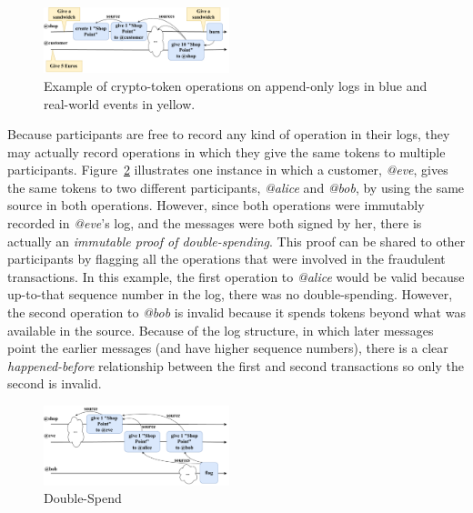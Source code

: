 \documentclass[sigplan,screen,10pt,review,anonymous]{acmart}
\begin{document}
\begin{figure}[htbp]
\centering
\includegraphics[width=0.48\textwidth]{./figures/example-drawio}
\caption{Example of crypto-token operations on append-only logs in blue and real-world events in yellow.}
\label{figure:example}
\end{figure}

Because participants are free to record any kind of operation in their logs, they may actually record operations in which they give the same tokens to multiple participants. Figure~\ref{figure:double-spend} illustrates one instance in which a customer, \textit{@eve}, gives the same tokens to two different participants, \textit{@alice} and \textit{@bob}, by using the same source in both operations. However, since both operations were immutably recorded in \textit{@eve}'s log, and the messages were both signed by her, there is actually an \textit{immutable proof of double-spending}. This proof can be shared to other participants by flagging all the operations that were involved in the fraudulent transactions. In this example, the first operation to \textit{@alice} would be valid because up-to-that sequence number in the log, there was no double-spending. However, the second operation to \textit{@bob} is  invalid because it spends tokens beyond what was available in the source. Because of the log structure, in which later messages point the earlier messages (and have higher sequence numbers), there is a clear \textit{happened-before} relationship between the first and second transactions so only the second is invalid.

\begin{figure}[htbp]
\includegraphics[width=0.48\textwidth]{figures/double-spend-drawio}
\caption{Double-Spend}
\label{figure:double-spend}
\end{figure}
\end{document}
